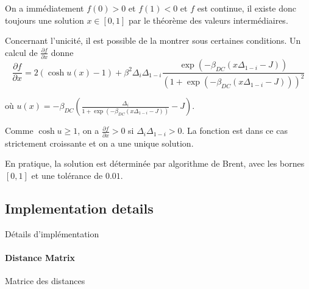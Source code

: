 On a immédiatement $f(0) > 0 $ et $f(1) < 0$ et $f$ est continue, il existe donc toujours une solution $x\in [0,1]$ par le théorème des valeurs intermédiaires.

Concernant l'unicité, il est possible de la montrer sous certaines conditions. Un calcul de $\frac{\partial f}{\partial x}$ donne 
\[
\frac{\partial f}{\partial x} = 2 (\cosh u(x) - 1) + \beta^2 \Delta_i \Delta_{1-i} \frac{\exp(-\beta_{DC}(x \Delta_{1-i} - J))}{(1 + \exp(-\beta_{DC}(x \Delta_{1-i} - J)))^2}
\]

où $u(x) = -\beta_{DC} (\frac{\Delta_i}{1 + \exp(-\beta_{DC}(x \Delta_{1-i} - J))} - J)$.

Comme $\cosh u \geq 1$, on a $\frac{\partial f}{\partial x} > 0$ si $\Delta_i \Delta_{1-i} > 0$. La fonction est dans ce cas strictement croissante et on a une unique solution.

En pratique, la solution est déterminée par algorithme de Brent, avec les bornes $[0,1]$ et une tolérance de $0.01$.


\subsection{Implementation details}{Détails d'implémentation}


\paragraph{Distance Matrix}{Matrice des distances}

